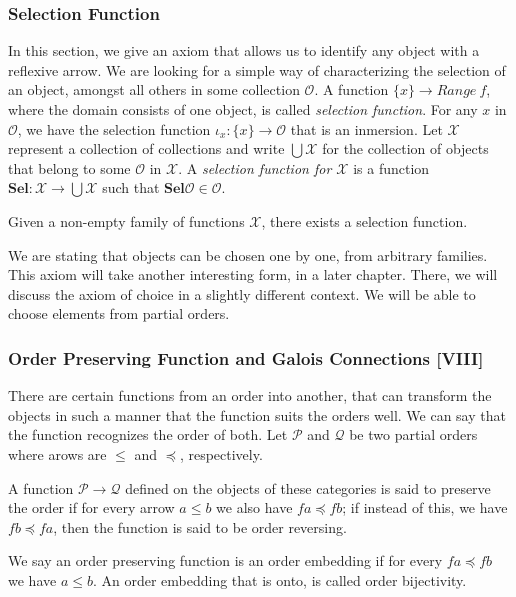 \documentclass [12pt]{book}
\begin{document}
\subsubsection{Selection Function}

In this section, we give an axiom that allows us to identify any object with a reflexive arrow. We are looking for a simple way of characterizing the selection of an object, amongst all others in some collection $\mathcal O$. A function $\{x\}\rightarrow Range~f$, where the domain consists of one object, is called \textit{selection function}. For any $x$ in $\mathcal O$, we have the selection function $\iota_x:\{x\}\rightarrow\mathcal O$ that is an inmersion. Let $\mathcal X$ represent a collection of collections and write $\bigcup\mathcal X$ for the collection of objects that belong to some $\mathcal O$ in $\mathcal X$. A \textit{selection function for $\mathcal X$} is a function $\textbf{Sel}:\mathcal X\rightarrow \bigcup\mathcal X$ such that $\textbf{Sel}\mathcal O\in\mathcal O$.

\begin{AOC}Given a non-empty family of functions $\mathcal X$, there exists a selection function.\end{AOC}

We are stating that objects can be chosen one by one, from arbitrary families. This axiom will take another interesting form, in a later chapter. There, we will discuss the axiom of choice in a slightly different context. We will be able to choose elements from partial orders.


\subsubsection{Order Preserving Function and Galois Connections [VIII]}

There are certain functions from an order into another, that can transform the objects in such a manner that the function suits the orders well. We can say that the function recognizes the order of both. Let $\mathcal{P}$ and $\mathcal Q$ be two partial orders where arows are $\leq$ and $\preceq$, respectively.

\begin{definition} A function $\mathcal P\rightarrow\mathcal Q$ defined on the objects of these categories is said to preserve the order if for every arrow $a\leq b$ we also have $fa\preceq fb$; if instead of this, we have $fb\preceq fa$, then the function is said to be order reversing.

We say an order preserving function is an order embedding if for every $fa\preceq fb$ we have $a\leq b$. An order embedding that is onto, is called order bijectivity.\end{definition}
\end{document}
